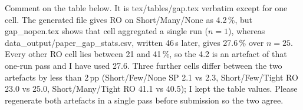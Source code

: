 \documentclass[preprint,12pt,3p]{elsarticle}
\newcommand{\green}[1]{{\color{darkgreen}#1}}
\begin{document}
\green{Comment on the table below. It is tex/tables/gap.tex verbatim except for
one cell. The generated file gives RO on Short/Many/None as 4.2\,\%, but
gap\_nopen.tex shows that cell aggregated a single run ($n=1$), whereas
data\_output/paper\_gap\_stats.csv, written 46\,s later, gives 27.6\,\% over
$n=25$. Every other RO cell lies between 21 and 41\,\%, so the 4.2 is an
artefact of that one-run pass and I have used 27.6. Three further cells differ
between the two artefacts by less than 2\,pp (Short/Few/None SP 2.1 vs 2.3,
Short/Few/Tight RO 23.0 vs 25.0, Short/Many/Tight RO 41.1 vs 40.5); I kept the
table values. Please regenerate both artefacts in a single pass before
submission so the two agree.}
\end{document}
